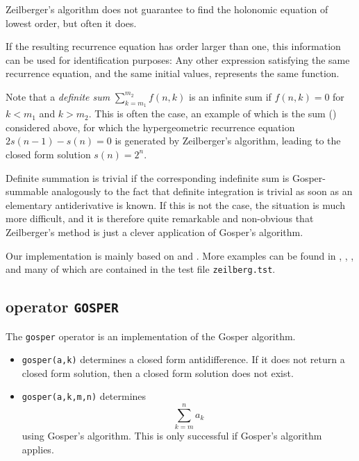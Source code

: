 Zeilberger's algorithm does not guarantee to find the holonomic equation
of lowest order, but often it does.

If the resulting recurrence equation has order larger than one,
this information can be used for identification purposes:
Any other expression satisfying the same recurrence equation, and the same
initial values, represents the same function.

Note that a \textsl{definite sum} $\sum\limits_{k=m_1}^{m_2} f(n,k)$ is an
infinite sum if $f(n,k)=0$ for $k<m_1$ and $k>m_2$.
This is often the case, an example of which is the sum ()
considered above, for which the hypergeometric recurrence equation
$2 s(n-1) - s(n) = 0$ is generated by Zeilberger's algorithm, leading
to the closed form solution $s(n)=2^n$.

Definite summation is trivial if the corresponding indefinite sum
is Gosper-summable analogously to the fact that definite integration
is trivial as soon as an elementary antiderivative is known.  If this is
not the case, the situation is much more difficult, and it is therefore
quite remarkable and non-obvious
that Zeilberger's method is just a clever application of Gosper's algorithm.

Our implementation is mainly based on \cite{Koornwinder:93} and \cite{Koepf:94b}.
More examples can be found in \cite{PauleSchorn:95}, \cite{Strehl:93}, \cite{Wilf:90},
and \cite{Wilf:93} many of which are contained in the test file
\texttt{zeilberg.tst}.

\subsection{\REDUCE{} operator \texttt{GOSPER}}

\iffalse
The ZEILBERG package must be loaded by:

{\small
\begin{verbatim}
1: load zeilberg;
\end{verbatim}
}\noindent
\fi

\hypertarget{operator:GOSPER}{}
The \texttt{gosper} operator is an implementation of the Gosper algorithm.
\begin{itemize}
\item
\texttt{gosper(a,k)} determines a closed
form antidifference. If it does not return a closed form solution, then
a closed form solution does not exist.
\item
\texttt{gosper(a,k,m,n)} determines
\[
\sum_{k=m}^n a_k
\]
using Gosper's algorithm. This is only successful if Gosper's algorithm applies.
\end{itemize}

